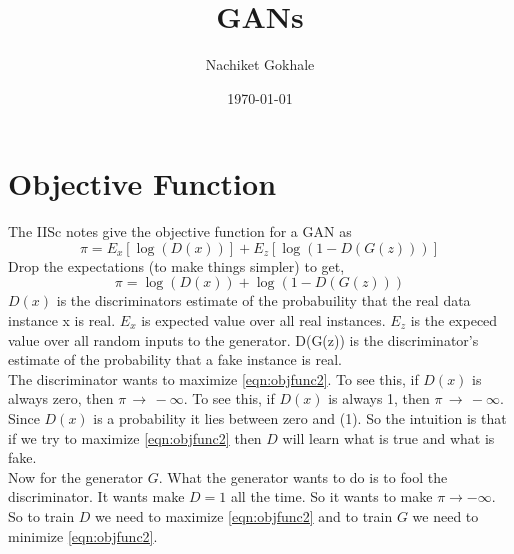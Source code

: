 \documentclass{article}
\newcommand{\beq}{\begin{equation}}
\newcommand{\eeq}{\end{equation}}
\begin{document}
\title{GANs}
\author{Nachiket Gokhale}
\date{\today}
\maketitle
\section{Objective Function}
The IISc notes give the objective function for a GAN as
%
\beq
\label{eqn:objfunc}
\pi = E_x[\log(D(x))] + E_z[\log(1-D(G(z)))]
\eeq
Drop the expectations (to make things simpler) to get,
\beq
\label{eqn:objfunc2}
\pi =\log(D(x)) + \log(1-D(G(z)))
\eeq
%
$D(x)$ is the discriminators estimate of the probabuility that the real data instance x is real. $E_x$ is expected value over all real instances. $E_z$ is the expeced value over all random inputs to the generator. D(G(z)) is the discriminator's estimate of the probability that a fake instance is real.\\

The discriminator wants to maximize \ref{eqn:objfunc2}. To see this, if $D(x)$ is always zero, then $\pi\,\rightarrow\,-\infty$. To see this, if $D(x)$ is always 1, then $\pi\,\rightarrow\,-\infty$. Since $D(x)$ is a probability it lies between zero and (1). So the intuition is that if we try to maximize  \ref{eqn:objfunc2} then $D$ will learn what is true and what is fake. \\

Now for the generator $G$. What the generator wants to do is to fool the discriminator. It wants make $D = 1$ all the time. So it wants to make $\pi\rightarrow{-\infty}$.\\

So to train $D$ we need to maximize \ref{eqn:objfunc2} and to train $G$ we need to minimize \ref{eqn:objfunc2}.\
\end{document}
